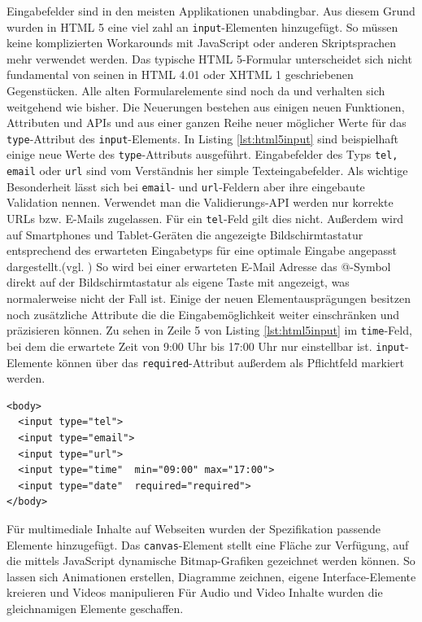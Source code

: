 Eingabefelder sind in den meisten Applikationen unabdingbar. Aus diesem Grund wurden in HTML 5 eine viel zahl an \texttt{input}-Elementen hinzugefügt. So müssen keine komplizierten Workarounds mit JavaScript oder anderen Skriptsprachen mehr verwendet werden. \glqq Das typische HTML 5-Formular unterscheidet sich nicht fundamental von seinen in HTML 4.01 oder XHTML 1 geschriebenen Gegenstücken. Alle alten Formularelemente sind noch da und verhalten sich weitgehend wie bisher. Die Neuerungen bestehen aus einigen neuen Funktionen, Attributen und APIs und aus einer ganzen Reihe neuer möglicher Werte für das \texttt{type}-Attribut des \texttt{input}-Elements.\grqq{}\cite[S.176]{KronHTML2011} In Listing \ref{lst:html5input} sind beispielhaft einige neue Werte des \texttt{type}-Attributs ausgeführt. Eingabefelder des Typs \texttt{tel, email} oder \texttt{url} sind vom Verständnis her simple Texteingabefelder. Als wichtige Besonderheit lässt sich bei \texttt{email}- und \texttt{url}-Feldern aber ihre eingebaute Validation nennen. Verwendet man die Validierungs-API werden nur korrekte URLs bzw. E-Mails zugelassen. Für ein \texttt{tel}-Feld gilt dies nicht. Außerdem wird auf Smartphones und Tablet-Geräten die angezeigte Bildschirmtastatur entsprechend des erwarteten Eingabetyps für eine optimale Eingabe angepasst dargestellt.(vgl. \cite[S.178]{KronHTML2011}) So wird bei einer erwarteten E-Mail Adresse das @-Symbol direkt auf der Bildschirmtastatur als eigene Taste mit angezeigt, was normalerweise nicht der Fall ist. Einige der neuen Elementausprägungen besitzen noch zusätzliche Attribute die die Eingabemöglichkeit weiter einschränken und präzisieren können. Zu sehen in Zeile 5 von Listing \ref{lst:html5input} im \texttt{time}-Feld, bei dem die erwartete Zeit von 9:00 Uhr bis 17:00 Uhr nur einstellbar ist. \texttt{input}-Elemente können über das \texttt{required}-Attribut außerdem als Pflichtfeld markiert werden.

\vspace{1em}
\begin{lstlisting}[language=HTML5, caption=HTML 5 \texttt{input}-Element, label=lst:html5input]
<body>
  <input type="tel">
  <input type="email">
  <input type="url">  
  <input type="time"  min="09:00" max="17:00">
  <input type="date"  required="required">
</body>
\end{lstlisting}
	
Für multimediale Inhalte auf Webseiten wurden der Spezifikation passende Elemente hinzugefügt. Das \texttt{canvas}-Element \glqq [...] stellt eine Fläche zur Verfügung, auf die mittels JavaScript dynamische Bitmap-Grafiken gezeichnet werden können. So lassen sich Animationen erstellen, Diagramme zeichnen, eigene Interface-Elemente kreieren und Videos manipulieren\grqq{}\cite[S.353]{KronHTML2011} Für Audio und Video Inhalte wurden die gleichnamigen Elemente geschaffen. 
	
